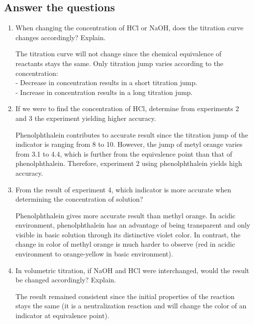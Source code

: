 \subsection{Answer the questions}
\begin{enumerate}
	\item When changing the concentration of HCl or NaOH, does the titration curve changes accordingly? Explain.
	
	The titration curve will not change since the chemical equivalence of reactants stays the same. Only titration jump varies according to the concentration:\\
	- Decrease in concentration results in a short titration jump.\\
	- Increase in concentration results in a long titration jump.
	
	\item If we were to find the concentration of HCl, determine from experiments 2 and 3 the experiment yielding higher accuracy.
	
	Phenolphthalein contributes to accurate result since the titration jump of the indicator is ranging from 8 to 10. However, the jump of metyl orange varies from 3.1 to 4.4, which is further from the equivalence point than that of phenolphthalein. Therefore, experiment 2 using phenolphthalein yields high accuracy.
	
	\item From the result of experiment 4, which indicator is more accurate when determining the concentration of  solution?
	
	Phenolphthalein gives more accurate result than methyl orange. In acidic environment, phenolphthalein has an advantage of being transparent and only visible in basic solution through its distinctive violet color. In contrast, the change in color of methyl orange is much harder to observe (red in acidic environment to orange-yellow in basic environment).
	
	\item In volumetric titration, if NaOH and HCl were interchanged, would the result be changed accordingly? Explain.
	
	The result remained consistent since the initial properties of the reaction stays the same (it is a neutralization reaction and will change the color of an indicator at equivalence point).
\end{enumerate}
